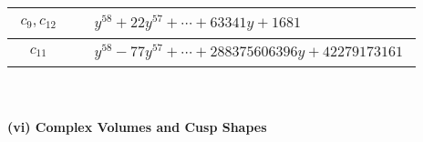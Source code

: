 \documentclass[1p]{elsarticle_modified}
\theoremstyle{definition}
\begin{document}
\begin{tabular}{m{50pt}|m{274pt}}
\hline $$\begin{aligned}c_{9},c_{12}\end{aligned}$$&$\begin{aligned}
&y^{58}+22 y^{57}+\cdots+63341 y+1681
\end{aligned}$\\
\hline $$\begin{aligned}c_{11}\end{aligned}$$&$\begin{aligned}
&y^{58}-77 y^{57}+\cdots+288375606396 y+42279173161
\end{aligned}$\\
\hline
\end{tabular}\\~\\
\newpage\flushleft \textbf{(vi) Complex Volumes and Cusp Shapes}
\end{document}
